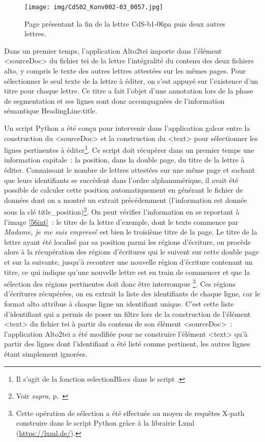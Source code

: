 \documentclass[a4paper,12pt,twoside]{book}
\begin{document}
			\begin{figure}[!h]
				\centering
				\texttt{[image: img/CdS02\_Konv002-03\_0057.jpg]}
				\caption{Page présentant la fin de la lettre \textsf{CdS-b1-06pa} puis deux autres lettres.}
				\label{57int}
			\end{figure}
		
			Dans un premier temps, l'application Alto2tei importe dans l'élément \textsf{<sourceDoc>} du fichier \gls{tei} de la lettre l'intégralité du contenu des deux fichiers \gls{alto}, y compris le texte des autres lettres attestées sur les mêmes pages. Pour sélectionner le seul texte de la lettre à éditer, on s'est appuyé sur l'existence d'un titre pour chaque lettre. Ce titre a fait l'objet d'une annotation lors de la phase de segmentation et ses lignes sont donc accompagnées de l'information sémantique \textsf{HeadingLine:title}.
			
			Un script Python a été conçu pour intervenir dans l'application \gls{galcor} entre la construction du \textsf{<sourceDoc>} et la construction du \textsf{<text>} pour sélectionner les lignes pertinentes à éditer\footnote{Il s'agit de la fonction \textsf{selectionBlocs} dans le script \cite{biayCdsFonctionsPy2022}.}. Ce script doit récupèrer dans un premier temps une information capitale~: la position, dans la double page, du titre de la lettre à éditer. Connaissant le nombre de lettres attestées sur une même page et sachant que leurs identifiants se succèdent dans l'ordre alphanumérique, il avait été possible de calculer cette position automatiquement en générant le fichier de données dont on a montré un extrait précédemment (l'information est donnée sous la clé \textsf{title\_position})\footnote{Voir \textit{supra}, p.~\pageref{json-CdS-b1-06pa}}. On peut vérifier l'information en se reportant à l'image \ref{56int}~: le titre de la lettre d'exemple, dont le texte commence par \textit{Madame, je me suis empressé} est bien le troisième titre de la page. Le titre de la lettre ayant été localisé par sa position parmi les régions d'écriture, on procède alors à la récupération des régions d'écritures qui le suivent sur cette double page et sur la suivante, jusqu'à recontrer une nouvelle région d'écriture contenant un titre, ce qui indique qu'une nouvelle lettre est en train de commencer et que la sélection des régions pertinentes doit donc être interrompue
			\footnote{Cette opération de sélection a été effectuée au moyen de requêtes X-path construire dans le script Python grâce à la librairie Lxml (\url{https://lxml.de/}).}. Ces régions d'écritures récupérées, on en extrait la liste des identifiants de chaque ligne, car le format \gls{alto} attribue à chaque ligne un identifiant unique. C'est cette liste d'identifiant qui a permis de poser un filtre lors de la construction de l'élément \textsf{<text>} du fichier \gls{tei} à partir du contenu de son élément \textsf{<sourceDoc>}~: l'application Alto2tei a été modifiée pour ne construire l'élément \textsf{<text>} qu'à partir des lignes dont l'identifiant a été listé comme pertinent, les autres lignes étant simplement ignorées.
			
\end{document}
